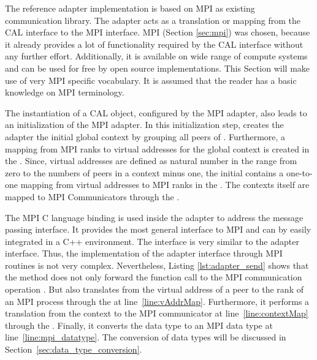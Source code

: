 The reference adapter implementation is based on MPI as existing
communication library. The adapter acts as a translation or mapping
from the CAL interface to the MPI interface.  MPI (Section
\ref{sec:mpi}) was chosen, because it already provides a lot of
functionality required by the CAL interface without any further
effort. Additionally, it is available on wide range of compute systems
and can be used for free by open source implementations. This Section
will make use of very MPI specific vocabulary. It is assumed that the
reader has a basic knowledge on MPI terminology.

The instantiation of a CAL object, configured by the MPI adapter, also
leads to an initialization of the MPI adapter. In this initialization step, creates the adapter the
initial global context by grouping all peers of
.  Furthermore, a mapping from MPI ranks to
virtual addresses for the global context is created in the
. Since, virtual addresses are defined as natural number
in the range from zero to the numbers of peers in a context minus one,
the initial  contains a one-to-one mapping from virtual
addresses to MPI ranks in the . The contexts
itself are mapped to MPI Communicators through the .


The MPI C language binding is used inside the adapter to address the
message passing interface.  It provides the most general interface to
MPI and can by easily integrated in a C++ environment.  The interface
is very similar to the adapter interface. Thus, the implementation of
the adapter interface through MPI routines is not very
complex. Nevertheless, Listing \ref{lst:adapter_send} shows that the
 method does not only forward the function call to
the MPI communication operation .  But also translates
from the virtual address  of a peer to the rank of an
MPI process through the  at line~\ref{line:vAddrMap}.
Furthermore, it performs a translation from the context to the MPI
communicator at line~\ref{line:contextMap} through the
. Finally, it converts the data type  to
an MPI data type at line~\ref{line:mpi_datatype}.  The conversion of
data types will be discussed in
Section~\ref{sec:data_type_conversion}.

